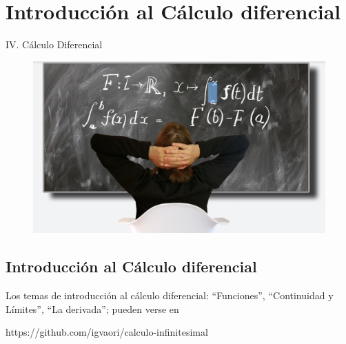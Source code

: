 \part{Introducción al Cálculo diferencial}

\null\vfill
\begin{Huge}\begin{center}
IV. Cálculo Diferencial	
\end{center}\end{Huge}

\vspace{1.5cm}

\begin{figure}[H]
	\centering
	\includegraphics[width=.9\textwidth]{imagenes/part4.png}	
\end{figure}
\par
\vfill


\chapter{Introducción al Cálculo diferencial}

\vspace{10mm}


Los temas de introducción al cálculo diferencial: ``Funciones'', ``Continuidad y Límites'', ``La derivada''; pueden verse en 

\begin{Large}
\hspace{2cm} \textcolor{NavyBlue}{https://github.com/igvaori/calculo-infinitesimal}
\end{Large}

